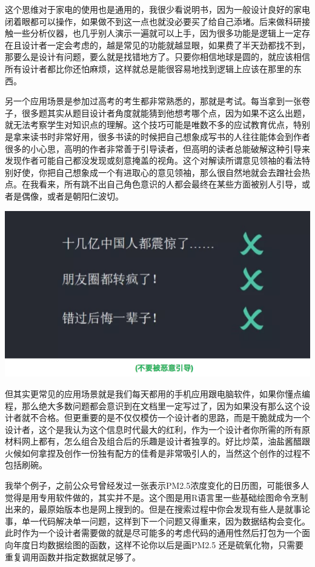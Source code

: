 \documentclass[]{book}
\begin{document}
这个思维对于家电的使用也是通用的，我很少看说明书，因为一般设计良好的家电闭着眼都可以操作，如果做不到这一点也就没必要买了给自己添堵。后来做科研接触一些分析仪器，也几乎别人演示一遍就可以上手，因为很多功能是逻辑上一定存在且设计者一定会考虑的，越是常见的功能就越显眼，如果费了半天劲都找不到，那要么是设计有问题，要么就是找错地方了。只要你相信地球是圆的，就应该相信所有设计者都比你还怕麻烦，这样就总是能很容易地找到逻辑上应该在那里的东西。

另一个应用场景是参加过高考的考生都非常熟悉的，那就是考试。每当拿到一张卷子，很多题其实从题目设计者角度就能猜到他想考哪个点，因为如果不这么出题，就无法考察学生对知识点的理解。这个技巧可能是唯数不多的应试教育优点，特别是拿来读书时非常好用，很多书读的时候把自己想象成写书的人往往能体会到作者很多的小心思，高明的作者非常善于引导读者，但高明的读者总能破解这种引导来发现作者可能自己都没发现或刻意掩盖的视角。这个对解读所谓意见领袖的看法特别好使，你把自己想象成一个有进取心的意见领袖，那么很自然地就会去蹭社会热点。在我看来，所有跳不出自己角色意识的人都会最终在某些方面被别人引导，或者是偶像，或者是朝阳仁波切。

\includegraphics[width=8.33in]{images/sheji4}

但其实更常见的应用场景就是我们每天都用的手机应用跟电脑软件，如果你懂点编程，那么绝大多数问题都会意识到在文档里一定写过了，因为如果没有那么这个设计者就不合格。但更重要的是不仅仅模仿一个设计者的思路，而是干脆就成为一个设计者，这个是我认为这个信息时代最大的红利，作为一个设计者你所需的所有原材料网上都有，怎么组合及组合后的乐趣是设计者独享的。好比炒菜，油盐酱醋跟火候如何拿捏及创作一份独有配方的佳肴是非常吸引人的，当然这个创作的过程不包括刷碗。

我举个例子，之前公众号曾经发过一张表示PM2.5浓度变化的日历图，可能很多人觉得是用专用软件做的，其实并不是。这个图是用R语言里一些基础绘图命令烹制出来的，最原始版本也是网上搜到的。但是在搜索过程中你会发现有些人是就事论事，单一代码解决单一问题，这样到下一个问题又得重来，因为数据结构会变化。此时作为一个设计者需要做的就是尽可能多的考虑代码的通用性然后打包为一个面向年度日均数据绘图的函数，这样不论你以后是画PM2.5 还是硫氧化物，只需要重复调用函数并指定数据就足够了。
\end{document}
